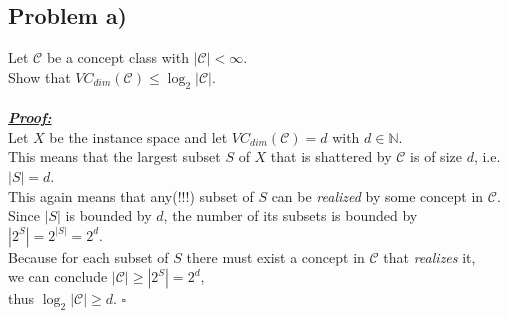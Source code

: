 \subsection*{Problem a)}
Let $\mathcal{C}$ be a concept class with $|\mathcal{C}| < \infty$.\\
Show that $VC_{dim}(\mathcal{C}) \leq \log _2 |\mathcal{C}|$.\\
\\
\textbf{\underline{\textit{Proof:}}}\\
Let $X$ be the instance space and
let $VC_{dim}(\mathcal{C}) = d$ with $d\in \mathbb{N}$.\\
This means that the largest subset $S$ of $X$ that is shattered by $\mathcal{C}$ is of size $d$, i.e. $|S|=d$.\\ 
This again means that any(!!!) subset of  $S$ can be \textit{realized} by some concept in $\mathcal{C}$.\\ 
Since $|S|$ is bounded by $d$, the number of its subsets is bounded by
$|2^{S}|= 2^{|S|} = 2^d$.\\ 
Because for each subset of $S$ there must exist a concept in $\mathcal{C}$ that \textit{realizes} it,\\ 
we can conclude $|\mathcal{C}| \geq |2^{S}|= 2^d$,\\ 
thus $\log _2|\mathcal{C}| \geq d$.
\hfill $\square$
